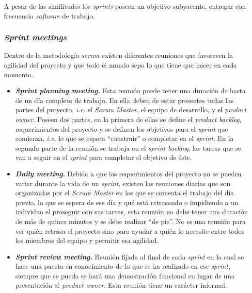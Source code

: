 A pesar de las similitudes los \textit{sprints} poseen un objetivo subyacente, entregar con frecuencia \textit{software} de trabajo.

\subsubsection{\textit{Sprint meetings}}
Dentro de la metodología \textit{scrum} existen diferentes reuniones que favorecen la agilidad del proyecto y que todo el mundo sepa lo que tiene que hacer en cada momento.
\begin{itemize}
\item \textbf{\textit{Sprint planning meeting.}} Esta reunión puede tener una duración de hasta de un día completo de trabajo. En ella deben de estar presentes todas las partes del proyecto, \textit{i.e.} el \textit{Scrum Master}, el equipo de desarrollo, y el \textit{product owner}. Poseen dos partes, en la primera de ellas se define el \textit{product backlog}, requerimientos del proyecto y se definen los objetivos para el \textit{sprint} que comienza, \textit{i.e.} lo que se espera ``construir'' o completar en el \textit{sprint}. En la segunda parte de la reunión se trabaja en el \textit{sprint backlog}, las tareas que se van a seguir en el \textit{sprint} para completar el objetivo de éste.
\item \textbf{\textit{Daily meeting.}} Debido a que los requerimientos del proyecto no se pueden variar durante la vida de un \textit{sprint}, existen las reuniones diarias que son organizadas por el \textit{Scrum Master} en las que se comenta el trabajo del día previo, lo que se espera de ese día y qué está retrasando o impidiendo a un individuo el proseguir con sus tareas, esta reunión no debe tener una duración de más de quince minutos y se debe realizar ``de pie''. No es una reunión para ver quién retrasa el proyecto sino para ayudar a quién lo necesite entre todos los miembros del equipo y permitir esa agilidad.
\item \textbf{\textit{Sprint review meeting.}} Reunión fijada al final de cada \textit{sprint} en la cual se hace una puesta en conocimiento de lo que se ha realizado en ese \textit{sprint}, siempre que se pueda se hará una demostración funcional en lugar de una presentación al \textit{product owner}. Esta reunión tiene un carácter informal.
\end{itemize}
 
